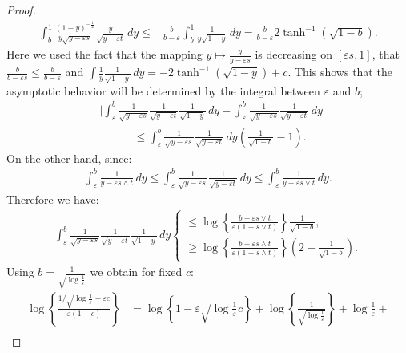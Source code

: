 \begin{proof}
\begin{align*}
    \int_{b}^1 \frac{(1-y)^{-\frac{1}{2}}}{y \sqrt{y - \varepsilon s}} \frac{y}{\sqrt{y - \varepsilon t}} \, dy \leq& \frac{b}{b - \varepsilon} \int_{b}^1 \frac{1}{y \sqrt{1-y}} \, dy = \frac{b}{b - \varepsilon} 2 \tanh^{-1} (\sqrt{1-b}). 
\end{align*}
Here we used the fact that the mapping $y \mapsto \frac{y}{y-\varepsilon s}$ is decreasing on $[\varepsilon s,1]$, that $\frac{b}{b - \varepsilon s} \leq \frac{b}{b - \varepsilon}$ and $\int \frac{1}{y} \frac{1}{\sqrt{1-y}} \, dy = -2 \tanh^{-1}(\sqrt{1-y}) + c$. This shows that the asymptotic behavior will be determined by the integral between $\varepsilon$ and $b$;
\begin{align*}
    &\bigg| \int_{\varepsilon}^{b} \frac{1}{\sqrt{y - \varepsilon s}} \frac{1}{\sqrt{y - \varepsilon t}} \frac{1}{\sqrt{1 - y}} \, dy - \int_{\varepsilon}^{b} \frac{1}{\sqrt{y - \varepsilon s}} \frac{1}{\sqrt{y - \varepsilon t}} \, dy \bigg| \\
    &\quad \quad \quad \leq \int_{\varepsilon}^{b} \frac{1}{\sqrt{y - \varepsilon s}} \frac{1}{\sqrt{y - \varepsilon t}} \, dy \left( \frac{1}{\sqrt{1-b}} -1 \right).
\end{align*}
On the other hand, since:
\begin{align*}
\int_{\varepsilon}^b \frac{1}{y-\varepsilon s \wedge t} \, d y \leqslant \int_{\varepsilon}^b \frac{1}{\sqrt{y-\varepsilon s}} \frac{1}{\sqrt{y-\varepsilon t}} \, d y \leqslant  \int_{\varepsilon}^b \frac{1}{y-\varepsilon s \vee t} \, d y.
\end{align*}
Therefore we have:
\begin{align*}
    \int_{\varepsilon}^{b} \frac{1}{\sqrt{y - \varepsilon s}} \frac{1}{\sqrt{y - \varepsilon t}} \frac{1}{\sqrt{1 - y}} \, dy 
    \begin{cases}
        \leq \log{\left\{ \frac{b - \varepsilon s \vee t}{\varepsilon (1 - s \vee t)} \right\}} \frac{1}{\sqrt{1-b}}, \\ 
        \geq \log{\left\{ \frac{b - \varepsilon s \wedge t}{\varepsilon (1 -  s \wedge t)} \right\}}\left(2 - \frac{1}{\sqrt{1-b}} \right).
    \end{cases}
\end{align*}
Using $b = \frac{1}{\sqrt{\log{\frac{1}{\varepsilon}}}}$ we obtain for fixed $c$: 
\begin{align*}
    \log{\left\{ \frac{1/\sqrt{\log{\frac{1}{\varepsilon}}} - \varepsilon c}{\varepsilon (1-c)} \right\}} &= \log{\left\{ 1 - \varepsilon \sqrt{\log{\frac{1}{\varepsilon}}} c\right\}} + \log{\left\{ \frac{1}{\sqrt{\log{\frac{1}{\varepsilon}}}} \right\}} + \log{\frac{1}{\varepsilon}} + \\ 

\end{align*}
\end{proof}
